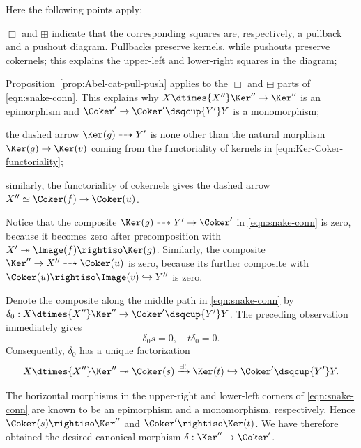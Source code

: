Here the following points apply:
\begin{compactitem}
	\item $\Box$ and $\boxplus$ indicate that the corresponding squares are,
	respectively, a pullback and a pushout diagram. Pullbacks preserve kernels,
	while pushouts preserve cokernels; this explains the upper-left and
	lower-right squares in the diagram;
	\item Proposition~\ref{prop:Abel-cat-pull-push} applies to the $\Box$ and
	$\boxplus$ parts of \eqref{eqn:snake-conn}. This explains why
	$X\dtimes{X''}\Ker''\to\Ker''$ is an epimorphism and
	$\Coker'\to\Coker'\dsqcup{Y'}Y$ is a monomorphism;
	\item the dashed arrow $\Ker(g)\dashrightarrow Y'$ is none other than the
	natural morphism $\Ker(g)\to\Ker(v)$ coming from the functoriality of
	kernels in \eqref{eqn:Ker-Coker-functoriality};
	\item similarly, the functoriality of cokernels gives the dashed arrow
	$X''\simeq\Coker(f)\to\Coker(u)$.
\end{compactitem}

Notice that the composite
$\Ker(g)\dashrightarrow Y'\to\Coker'$ in \eqref{eqn:snake-conn} is zero,
because it becomes zero after precomposition with
$X'\twoheadrightarrow\Image(f)\rightiso\Ker(g)$. Similarly, the composite
$\Ker''\to X''\dashrightarrow\Coker(u)$ is zero, because its further
composite with $\Coker(u)\rightiso\Image(v)\hookrightarrow Y''$ is zero.

Denote the composite along the middle path in \eqref{eqn:snake-conn} by
$\delta_0:X\dtimes{X''}\Ker''\to\Coker'\dsqcup{Y'}Y$. The preceding
observation immediately gives
\[ \delta_0 s = 0, \quad t \delta_0 = 0. \]
Consequently, $\delta_0$ has a unique factorization
\[ X \dtimes{X''} \Ker'' \twoheadrightarrow \Coker(s) \xrightarrow{\exists!} \Ker(t) \hookrightarrow \Coker' \dsqcup{Y'} Y . \]

The horizontal morphisms in the upper-right and lower-left corners of
\eqref{eqn:snake-conn} are known to be an epimorphism and a monomorphism,
respectively. Hence $\Coker(s)\rightiso\Ker''$ and
$\Coker'\rightiso\Ker(t)$. We have therefore obtained the desired canonical
morphism $\delta:\Ker''\to\Coker'$.

